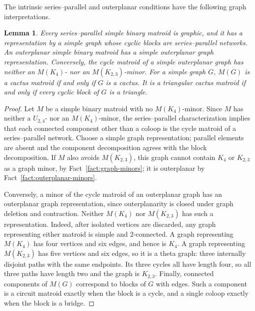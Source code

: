 \documentclass[12pt,a4paper]{article}
\numberwithin{equation}{section}
\newtheorem{lemma}[lemma]{Lemma}
\theoremstyle{definition}
\theoremstyle{remark}
\begin{document}
The intrinsic series--parallel and outerplanar conditions have the
following graph interpretations.
\begin{lemma}\label{lem:regular-sp-outerplanar}
Every series--parallel simple binary matroid is graphic, and it has a
representation by a simple graph whose cyclic blocks are
series--parallel networks.  An outerplanar simple binary matroid has a
simple outerplanar graph representation.  Conversely, the cycle matroid
of a simple outerplanar graph has neither an \(M(K_4)\)- nor an
\(M(K_{2,3})\)-minor.
For a simple graph \(G\), \(M(G)\) is a cactus matroid if and only if
\(G\) is a cactus.  It is a triangular cactus matroid if and only if
every cyclic block of \(G\) is a triangle.
\end{lemma}
\begin{proof}
Let \(M\) be a simple binary matroid with no \(M(K_4)\)-minor.
Since \(M\) has neither a \(U_{2,4}\)- nor an \(M(K_4)\)-minor,
the series--parallel characterization
\cite{brylawski-series-parallel,bonin-long} implies that each
connected component other than a coloop is the cycle matroid of
a series--parallel network.  Choose a simple graph representation;
parallel elements are absent and the component decomposition agrees
with the block decomposition.  If \(M\) also avoids \(M(K_{2,3})\),
this graph cannot contain \(K_4\) or \(K_{2,3}\) as a graph minor, by
Fact~\ref{fact:graph-minors}; it is outerplanar by
Fact~\ref{fact:outerplanar-minors}.

Conversely, a minor of the cycle matroid of an outerplanar graph has
an outerplanar graph representation, since outerplanarity is closed
under graph deletion and contraction.  Neither \(M(K_4)\) nor
\(M(K_{2,3})\) has such a representation.  Indeed, after isolated
vertices are discarded, any graph representing either matroid is
simple and \(2\)-connected.  A graph representing \(M(K_4)\) has
four vertices and six edges, and hence is \(K_4\).  A graph
representing \(M(K_{2,3})\) has five vertices and six edges, so it
is a theta graph: three internally disjoint paths with the same
endpoints.  Its three cycles all have length four, so all three
paths have length two and the graph is \(K_{2,3}\).
Finally, connected components of \(M(G)\) correspond to blocks
of \(G\) with edges.  Such a component is a circuit matroid
exactly when the block is a cycle, and a single coloop exactly
when the block is a bridge.
\end{proof}
\end{document}
